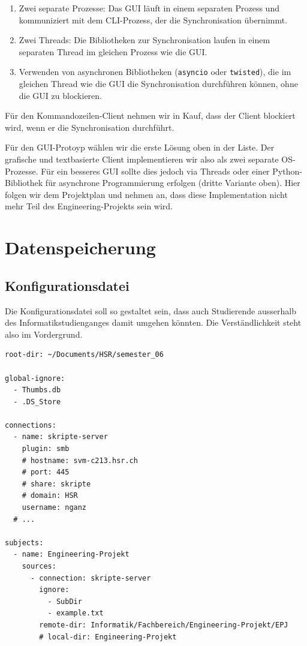 \documentclass[a4paper]{article}
\let\oldsection\section
\renewcommand\section{\clearpage\oldsection}
\begin{document}
\begin{enumerate}
	\item Zwei separate Prozesse: Das GUI läuft in einem separaten Prozess und kommuniziert mit dem CLI-Prozess, der die Synchronisation übernimmt.
	\item Zwei Threads: Die Bibliotheken zur Synchronisation laufen in einem separaten Thread im gleichen Prozess wie die GUI.
	\item Verwenden von asynchronen Bibliotheken (\verb|asyncio| oder \verb|twisted|), die im gleichen Thread wie die GUI die Synchronisation durchführen können, ohne die GUI zu blockieren.
\end{enumerate}

Für den Kommandozeilen-Client nehmen wir in Kauf, dass der Client blockiert wird, wenn er die Synchronisation durchführt.

Für den GUI-Protoyp wählen wir die erste Lösung oben in der Liste. Der grafische und textbasierte Client implementieren wir also als zwei separate OS-Prozesse. Für ein besseres GUI sollte dies jedoch via Threads oder einer Python-Bibliothek für asynchrone Programmierung erfolgen (dritte Variante oben). Hier folgen wir dem Projektplan und nehmen an, dass diese Implementation nicht mehr Teil des Engineering-Projekts sein wird.

\section{Datenspeicherung}

\subsection{Konfigurationsdatei}
Die Konfigurationsdatei soll so gestaltet sein, dass auch Studierende ausserhalb des Informatikstudienganges damit umgehen könnten. Die Verständlichkeit steht also im Vordergrund.

\begin{verbatim}
root-dir: ~/Documents/HSR/semester_06

global-ignore:
  - Thumbs.db
  - .DS_Store

connections:
  - name: skripte-server
    plugin: smb
    # hostname: svm-c213.hsr.ch
    # port: 445
    # share: skripte
    # domain: HSR
    username: nganz
  # ...

subjects:
  - name: Engineering-Projekt
    sources:
      - connection: skripte-server
        ignore:
          - SubDir
          - example.txt
        remote-dir: Informatik/Fachbereich/Engineering-Projekt/EPJ
        # local-dir: Engineering-Projekt
\end{verbatim}
\end{document}
